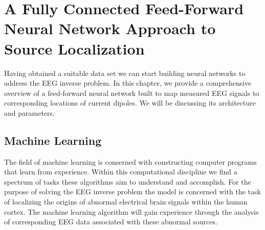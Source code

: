 \documentclass[a4paper, UKenglish, 11pt]{uiomaster}
\begin{document}
\chapter{A Fully Connected Feed-Forward Neural Network Approach to Source Localization}

Having obtained a suitable data set we can start building neural networks to address the EEG inverse problem. In this chapter, we provide a comprehensive overview of a feed-forward neural network built to map measured EEG signals to corresponding locations of current dipoles. We will be discussing its architecture and parameters.



%
%


\section{Machine Learning}
The field of machine learning is conserned with constructing computer programs that learn from experience. Within this computational discipline we find a spectrum of tasks these algorithms aim to understand and accomplish. For the purpose of solving the EEG inverse problem the model is concerned with the task of localizing the origins of abnormal electrical brain signals within the human cortex. The machine learning algorithm will gain experience through the analysis of corresponding EEG data associated with these abnormal sources.
\end{document}

